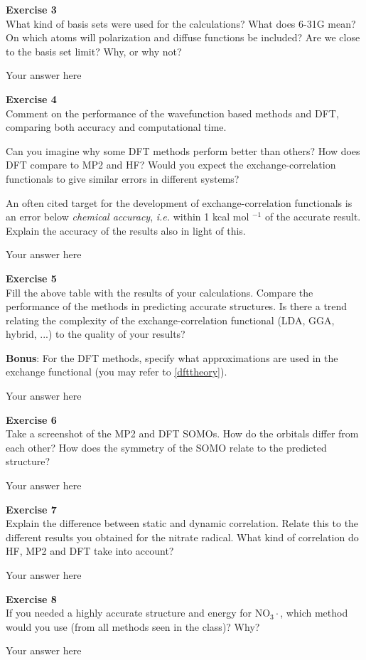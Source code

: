 \documentclass{article}
\begin{document}
\begin{mdframed}
\textbf{Exercise 3}\\
What kind of basis sets were used for the calculations? What does 6-31G mean? On which atoms will polarization and diffuse functions be included? Are we close to the basis set limit? Why, or why not?
\end{mdframed}

Your answer here

\begin{mdframed}
\textbf{Exercise 4}\\
Comment on the performance of the wavefunction based methods and DFT, comparing both accuracy and computational time.

Can you imagine why some DFT methods perform better than others? How does DFT compare to MP2 and HF?
Would you expect the exchange-correlation functionals to give similar errors in different systems?

An often cited target for the development of exchange-correlation functionals is an error below \textit{chemical accuracy}, \textit{i.e.} within 1
kcal mol $^{ -1}$ of the accurate result. Explain the accuracy of the results also in light of this.
\end{mdframed}

Your answer here

\begin{mdframed}
\textbf{Exercise 5}\\
Fill the above table with the results of your calculations. Compare the performance of the methods in predicting accurate structures. Is there a trend relating the complexity of the exchange-correlation functional (LDA, GGA, hybrid, ...) to the quality of your results?

\textbf{Bonus}: For the DFT methods, specify what approximations are used in the exchange functional (you may refer to \ref{dfttheory}).
\end{mdframed}

Your answer here

\begin{mdframed}
\textbf{Exercise 6}\\
Take a screenshot of the MP2 and DFT SOMOs. How do the orbitals differ from each other? How does the symmetry of the SOMO relate to the predicted structure?
\end{mdframed}

Your answer here

\begin{mdframed}
\textbf{Exercise 7}\\
Explain the difference between static and dynamic correlation. Relate this to the different results you obtained for the nitrate radical. What kind of correlation do HF, MP2 and DFT take into account?
\end{mdframed}

Your answer here

\begin{mdframed}
\textbf{Exercise 8}\\
If you needed a highly accurate structure and energy for  NO$_3\cdot$, which method would you use (from all methods seen in the class)? Why?
\end{mdframed}

Your answer here
\end{document}
